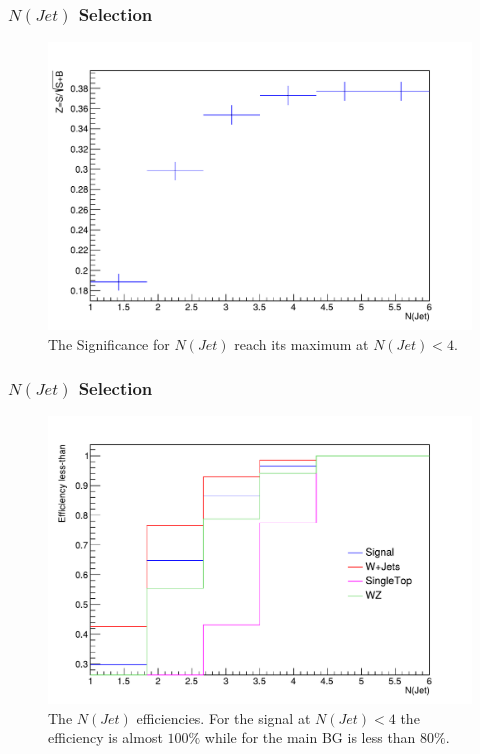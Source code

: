 \documentclass{beamer}
\begin{document}
\begin{frame}
\frametitle{$N(Jet)$ Selection}
\begin{figure}[!h]

\centering
\includegraphics[scale=0.45]{pictures/Selection/NJet/Sig-NJet}
\caption{{\scriptsize The Significance for $N(Jet)$ reach its maximum at $N(Jet)< 4$.}}
\label{Sig-NJet}

\end{figure}


\end{frame}



\begin{frame}
\frametitle{$N(Jet)$ Selection}
\begin{figure}[!h]

\centering
\includegraphics[scale=0.45]{pictures/Selection/NJet/Eff-NJet}
\caption{{\scriptsize The $N(Jet)$ efficiencies. For the signal at  $N(Jet)< 4$ the efficiency is almost $100\%$ while for the main BG is less than $80\%$.}}
\label{Eff-NJet}

\end{figure}


\end{frame}
\end{document}
